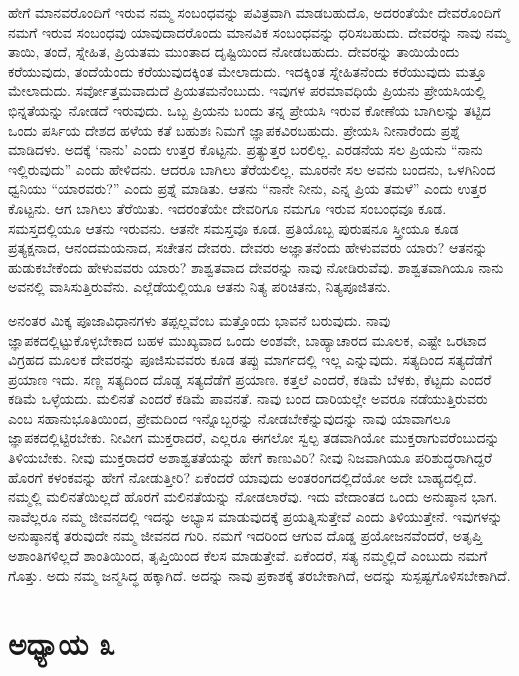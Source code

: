 \vskip 5pt

ಹೇಗೆ ಮಾನವರೊಂದಿಗೆ ಇರುವ ನಮ್ಮ ಸಂಬಂಧವನ್ನು ಪವಿತ್ರವಾಗಿ ಮಾಡಬಹುದೊ, ಅದರಂತೆಯೇ ದೇವರೊಂದಿಗೆ ನಮಗೆ ಇರುವ ಸಂಬಂಧವು ಯಾವುದಾದರೊಂದು ಮಾನವಿಕ ಸಂಬಂಧವನ್ನು ಧರಿಸಬಹುದು. ದೇವರನ್ನು ನಾವು ನಮ್ಮ ತಾಯಿ, ತಂದೆ, ಸ್ನೇಹಿತ, ಪ್ರಿಯತಮ ಮುಂತಾದ ದೃಷ್ಟಿಯಿಂದ ನೋಡಬಹುದು. ದೇವರನ್ನು ತಾಯಿಯೆಂದು ಕರೆಯುವುದು, ತಂದೆಯೆಂದು ಕರೆಯುವುದಕ್ಕಿಂತ ಮೇಲಾದುದು. ಇದಕ್ಕಿಂತ ಸ್ನೇಹಿತನೆಂದು ಕರೆಯುವುದು ಮತ್ತೂ ಮೇಲಾದುದು. ಸರ್ವೋತ್ತಮವಾದುದೆ ಪ್ರಿಯತಮನೆಂಬುದು. ಇವುಗಳ ಪರಮಾವಧಿಯೆ ಪ್ರಿಯನು ಪ್ರೇಯಸಿಯಲ್ಲಿ ಭಿನ್ನತೆಯನ್ನು ನೋಡದೆ ಇರುವುದು. ಒಬ್ಬ ಪ್ರಿಯನು ಬಂದು ತನ್ನ ಪ್ರೇಯಸಿ ಇರುವ ಕೋಣೆಯ ಬಾಗಿಲನ್ನು ತಟ್ಟಿದ ಒಂದು ಪರ್ಸಿಯ ದೇಶದ ಹಳೆಯ ಕತೆ ಬಹುಶಃ ನಿಮಗೆ ಜ್ಞಾಪಕವಿರಬಹುದು. ಪ್ರೇಯಸಿ ನೀನಾರೆಂದು ಪ್ರಶ್ನೆ ಮಾಡಿದಳು. ಅದಕ್ಕೆ ‘ನಾನು’ ಎಂದು ಉತ್ತರ ಕೊಟ್ಟನು. ಪ್ರತ್ಯುತ್ತರ ಬರಲಿಲ್ಲ. ಎರಡನೆಯ ಸಲ ಪ್ರಿಯನು “ನಾನು ಇಲ್ಲಿರುವುದು” ಎಂದು ಹೇಳಿದನು. ಆದರೂ ಬಾಗಿಲು ತೆರೆಯಲಿಲ್ಲ. ಮೂರನೇ ಸಲ ಅವನು ಬಂದನು, ಒಳಗಿನಿಂದ ಧ್ವನಿಯು “ಯಾರವರು?” ಎಂದು ಪ್ರಶ್ನೆ ಮಾಡಿತು. ಆತನು “ನಾನೇ ನೀನು, ಎನ್ನ ಪ್ರಿಯ ತಮಳೆ” ಎಂದು ಉತ್ತರ ಕೊಟ್ಟನು. ಆಗ ಬಾಗಿಲು ತೆರೆಯಿತು. ಇದರಂತೆಯೇ ದೇವರಿಗೂ ನಮಗೂ ಇರುವ ಸಂಬಂಧವೂ ಕೂಡ. ಸಮಸ್ತದಲ್ಲಿಯೂ ಆತನು ಇರುವನು. ಆತನೇ ಸಮಸ್ತವೂ ಕೂಡ. ಪ್ರತಿಯೊಬ್ಬ ಪುರುಷನೂ ಸ್ತ್ರೀಯೂ ಕೂಡ ಪ್ರತ್ಯಕ್ಷನಾದ, ಆನಂದಮಯನಾದ, ಸಚೇತನ ದೇವರು. ದೇವರು ಅಜ್ಞಾತನೆಂದು ಹೇಳುವವರು ಯಾರು? ಆತನನ್ನು ಹುಡುಕಬೇಕೆಂದು ಹೇಳುವವರು ಯಾರು? ಶಾಶ್ವತವಾದ ದೇವರನ್ನು ನಾವು ನೋಡಿರುವೆವು. ಶಾಶ್ವತವಾಗಿಯೂ ನಾನು ಅವನಲ್ಲಿ ವಾಸಿಸುತ್ತಿರುವೆನು. ಎಲ್ಲೆಡೆಯಲ್ಲಿಯೂ ಆತನು ನಿತ್ಯ ಪರಿಚಿತನು, ನಿತ್ಯಪೂಜಿತನು. 

\vskip 5pt

ಅನಂತರ ಮಿಕ್ಕ ಪೂಜಾವಿಧಾನಗಳು ತಪ್ಪಲ್ಲವೆಂಬ ಮತ್ತೊಂದು ಭಾವನೆ ಬರುವುದು. ನಾವು ಜ್ಞಾಪಕದಲ್ಲಿಟ್ಟುಕೊಳ್ಳಬೇಕಾದ ಬಹಳ ಮುಖ್ಯವಾದ ಒಂದು ಅಂಶವೇ, ಬಾಹ್ಯಾಚಾರದ ಮೂಲಕ, ಎಷ್ಟೇ ಒರಟಾದ ವಿಗ್ರಹದ ಮೂಲಕ ದೇವರನ್ನು ಪೂಜಿಸುವವರು ಕೂಡ ತಪ್ಪು ಮಾರ್ಗದಲ್ಲಿ ಇಲ್ಲ ಎನ್ನುವುದು. ಸತ್ಯದಿಂದ ಸತ್ಯದೆಡೆಗೆ ಪ್ರಯಾಣ ಇದು. ಸಣ್ಣ ಸತ್ಯದಿಂದ ದೊಡ್ಡ ಸತ್ಯದೆಡೆಗೆ ಪ್ರಯಾಣ. ಕತ್ತಲೆ ಎಂದರೆ, ಕಡಿಮೆ ಬೆಳಕು, ಕೆಟ್ಟದು ಎಂದರೆ ಕಡಿಮೆ ಒಳ್ಳೆಯದು. ಮಲಿನತೆ ಎಂದರೆ ಕಡಿಮೆ ಪಾವನತೆ. ನಾವು ಬಂದ ದಾರಿಯಲ್ಲೇ ಅವರೂ ನಡೆಯುತ್ತಿರುವರು ಎಂಬ ಸಹಾನುಭೂತಿಯಿಂದ, ಪ್ರೇಮದಿಂದ ಇನ್ನೊಬ್ಬರನ್ನು ನೋಡಬೇಕೆನ್ನುವುದನ್ನು ನಾವು ಯಾವಾಗಲೂ ಜ್ಞಾಪಕದಲ್ಲಿಟ್ಟಿರಬೇಕು. ನೀವೀಗ ಮುಕ್ತರಾದರೆ, ಎಲ್ಲರೂ ಈಗಲೋ ಸ್ವಲ್ಪ ತಡವಾಗಿಯೋ ಮುಕ್ತರಾಗುವರೆಂಬುದನ್ನು ತಿಳಿಯಬೇಕು. ನೀವು ಮುಕ್ತರಾದರೆ ಅಶಾಶ್ವತತೆಯನ್ನು ಹೇಗೆ ಕಾಣುವಿರಿ? ನೀವು ನಿಜವಾಗಿಯೂ ಪರಿಶುದ್ಧರಾಗಿದ್ದರೆ ಹೊರಗೆ ಕಳಂಕವನ್ನು ಹೇಗೆ ನೋಡುತ್ತೀರಿ? ಏಕೆಂದರೆ ಯಾವುದು ಅಂತರಂಗದಲ್ಲಿದೆಯೋ ಅದೇ ಬಾಹ್ಯದಲ್ಲಿದೆ. ನಮ್ಮಲ್ಲಿ ಮಲಿನತೆಯಿಲ್ಲದೆ ಹೊರಗೆ ಮಲಿನತೆಯನ್ನು ನೋಡಲಾರೆವು. ಇದು ವೇದಾಂತದ ಒಂದು ಅನುಷ್ಠಾನ ಭಾಗ. ನಾವೆಲ್ಲರೂ ನಮ್ಮ ಜೀವನದಲ್ಲಿ ಇದನ್ನು ಅಭ್ಯಾಸ ಮಾಡುವುದಕ್ಕೆ ಪ್ರಯತ್ನಿಸುತ್ತೇವೆ ಎಂದು ತಿಳಿಯುತ್ತೇನೆ. ಇವುಗಳನ್ನು ಅನುಷ್ಠಾನಕ್ಕೆ ತರುವುದೇ ನಮ್ಮ ಜೀವನದ ಗುರಿ. ನಮಗೆ ಇದರಿಂದ ಆಗುವ ದೊಡ್ಡ ಪ್ರಯೋಜನವೆಂದರೆ, ಅತೃಪ್ತಿ ಅಶಾಂತಿಗಳಿಲ್ಲದೆ ಶಾಂತಿಯಿಂದ, ತೃಪ್ತಿಯಿಂದ ಕೆಲಸ ಮಾಡುತ್ತೇವೆ. ಏಕೆಂದರೆ, ಸತ್ಯ ನಮ್ಮಲ್ಲಿದೆ ಎಂಬುದು ನಮಗೆ ಗೊತ್ತು. ಅದು ನಮ್ಮ ಜನ್ಮಸಿದ್ಧ ಹಕ್ಕಾಗಿದೆ. ಅದನ್ನು ನಾವು ಪ್ರಕಾಶಕ್ಕೆ ತರಬೇಕಾಗಿದೆ, ಅದನ್ನು ಸುಸ್ಪಷ್ಟಗೊಳಿಸಬೇಕಾಗಿದೆ.

\chapter{ಅಧ್ಯಾಯ ೩}

